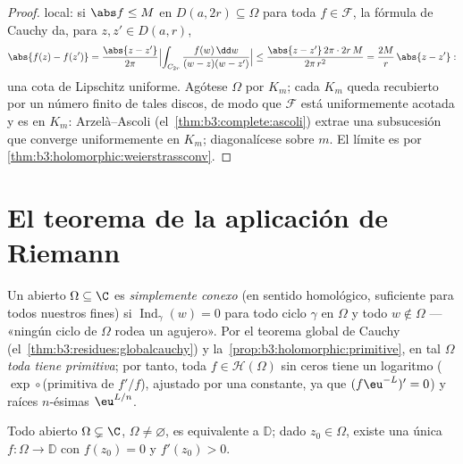 \begin{proof}
 local: si
$\abs f \leq M$ en $D(a, 2r)
\subseteq \Omega$ para toda $f \in \mathcal F$, la fórmula de Cauchy da,
para $z, z' \in D(a, r)$,
\[
\abs{f(z) - f(z')} = \frac{\abs{z - z'}}{2\pi}
\Bigl|\int_{C_{2r}}\frac{f(w)\,\dd w}{(w-z)(w-z')}\Bigr|
\leq \frac{\abs{z - z'}\,2\pi\cdot2r\,M}{2\pi\,r^2}
= \frac{2M}{r}\,\abs{z - z'} :
\]
una cota de Lipschitz uniforme. Agótese $\Omega$ por
 $K_m$; cada $K_m$ queda
recubierto por un número finito de tales discos, de modo que
$\mathcal F$ está uniformemente acotada y es
 en $K_m$:
Arzelà--Ascoli (el~\cref{thm:b3:complete:ascoli}) extrae una subsucesión
que converge uniformemente en $K_m$; diagonalícese sobre $m$. El límite
es  por
\cref{thm:b3:holomorphic:weierstrassconv}.
\end{proof}

\section{El teorema de la aplicación de Riemann}

\begin{definition}\label{def:b3:conformal:simplyconnected}
Un abierto 
$\Omega \subseteq \C$ es \emph{simplemente conexo} (en sentido homológico, suficiente para todos
nuestros fines) si $\operatorname{Ind}_\gamma(w) = 0$ para todo ciclo
$\gamma$ en $\Omega$ y todo $w \notin \Omega$ --- «ningún ciclo de
$\Omega$ rodea un agujero». Por el teorema global de Cauchy
(el~\cref{thm:b3:residues:globalcauchy}) y
la~\cref{prop:b3:holomorphic:primitive}, en tal $\Omega$ \emph{toda
 tiene primitiva};
por tanto, toda $f \in \mathcal H(\Omega)$ sin ceros tiene un logaritmo
 ($\exp\circ$(primitiva de
$f'/f$), ajustado por una constante, ya que $(f\eu^{-L})' = 0$) y raíces
$n$-ésimas 
$\eu^{L/n}$.
\end{definition}

\begin{theorem}
\label{thm:b3:conformal:rmt}
Todo abierto  $\Omega \subsetneq \C$, $\Omega
\neq \varnothing$, es 
equivalente a $\mathbb D$; dado $z_0 \in \Omega$, existe una única
 $f \colon
\Omega \to \mathbb D$ con $f(z_0) = 0$ y $f'(z_0) >
0$.
\end{theorem}

